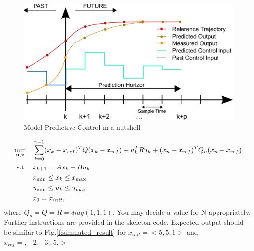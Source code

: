 \documentclass[12pt]{article}%
\begin{document}
\begin{figure}[H]
    \begin{center}
    \includegraphics[width=13cm]{mpc.png}
    \caption{Model Predictive Control in a nutshell\cite{mpc1}}\label{f:mpc}
    \end{center}
\end{figure}

\begin{equation}\label{mpc_1}
\begin{aligned}
\min_{\mathbf{u}, \mathbf{x}} \quad & \sum_{k=0}^{n-1} (x_k-x_{ref})^T Q (x_k-x_{ref}) + u_k^T R u_k + (x_n-x_{ref})^T Q_n (x_n-x_{ref})   \\
\textrm{s.t.} \quad & x_{k+1} = A x_k + B u_k \\ 
 & x_{\rm min} \le x_k  \le x_{\rm max} \\
 & u_{\rm min} \le u_k  \le u_{\rm max} \\
 & x_0 = x_{init},
\end{aligned}
\end{equation} where $Q_n = Q = R = diag(1,1,1)$. You may decide a value for N appropriately. Further instructions are provided in the skeleton code. Expected output should be similar to Fig.\ref{f:simulated_result} for $x_{init} = <5,5,1>$ and $x_{ref} =,-2,-3.,5.>$
\end{document}
